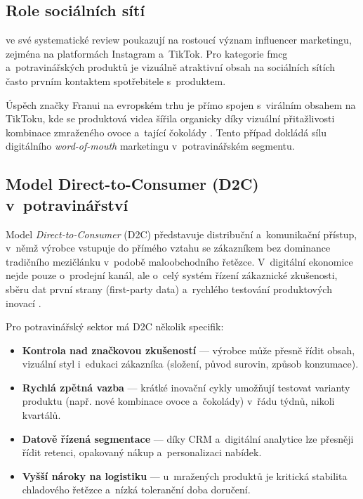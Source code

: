 \subsection{Role sociálních sítí}

\textcite{vrontis_2021} ve své systematické review poukazují na rostoucí význam influencer marketingu, zejména na platformách Instagram a~TikTok. Pro kategorie \gls{fmcg} a~potravinářských produktů je vizuálně atraktivní obsah na sociálních sítích často prvním kontaktem spotřebitele s~produktem.

Úspěch značky Franui na evropském trhu je přímo spojen s~virálním obsahem na TikToku, kde se produktová videa šířila organicky díky vizuální přitažlivosti kombinace zmraženého ovoce a~tající čokolády \parencite{franui_web}. Tento případ dokládá sílu digitálního \emph{word-of-mouth} marketingu v~potravinářském segmentu.

\subsection{Model Direct-to-Consumer (D2C) v~potravinářství}
\label{subsec:theory_d2c}

Model \emph{Direct-to-Consumer} (D2C) představuje distribuční a~komunikační přístup, v~němž výrobce vstupuje do přímého vztahu se zákazníkem bez dominance tradičního mezičlánku v~podobě maloobchodního řetězce. V~digitální ekonomice nejde pouze o~prodejní kanál, ale o~celý systém řízení zákaznické zkušenosti, sběru dat první strany (first-party data) a~rychlého testování produktových inovací \parencite{chaffey_ellis_2019}.

Pro potravinářský sektor má D2C několik specifik:
\begin{itemize}
  \item \textbf{Kontrola nad značkovou zkušeností} --- výrobce může přesně řídit obsah, vizuální styl i~edukaci zákazníka (složení, původ surovin, způsob konzumace).
  \item \textbf{Rychlá zpětná vazba} --- krátké inovační cykly umožňují testovat varianty produktu (např. nové kombinace ovoce a~čokolády) v~řádu týdnů, nikoli kvartálů.
  \item \textbf{Datově řízená segmentace} --- díky CRM a~digitální analytice lze přesněji řídit retenci, opakovaný nákup a~personalizaci nabídek.
  \item \textbf{Vyšší nároky na logistiku} --- u~mražených produktů je kritická stabilita chladového řetězce a~nízká toleranční doba doručení.
\end{itemize}

